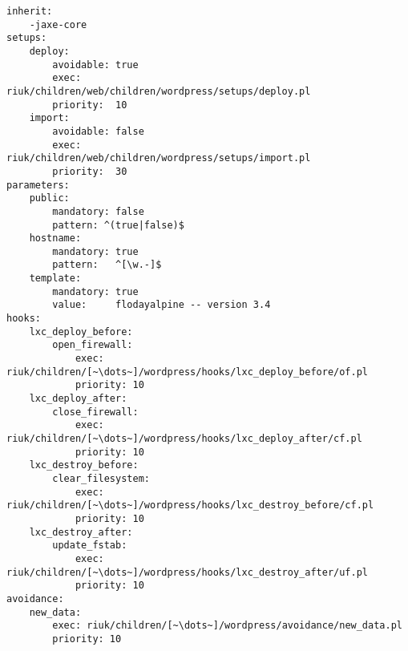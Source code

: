 \begin{lstlisting}[float=t, caption={config.yml}, label=fig_1.3_config]
inherit:
	-jaxe-core
setups:
	deploy:
		avoidable: true
		exec:      riuk/children/web/children/wordpress/setups/deploy.pl
		priority:  10
	import:
		avoidable: false
		exec:      riuk/children/web/children/wordpress/setups/import.pl
		priority:  30
parameters:
	public:
		mandatory: false
		pattern: ^(true|false)$
	hostname:
		mandatory: true
		pattern:   ^[\w.-]$
	template:
		mandatory: true
		value:     flodayalpine -- version 3.4
hooks:
	lxc_deploy_before:
		open_firewall:
			exec:     riuk/children/[~\dots~]/wordpress/hooks/lxc_deploy_before/of.pl
			priority: 10
	lxc_deploy_after:
		close_firewall:
			exec:     riuk/children/[~\dots~]/wordpress/hooks/lxc_deploy_after/cf.pl
			priority: 10
	lxc_destroy_before:
		clear_filesystem:
			exec:     riuk/children/[~\dots~]/wordpress/hooks/lxc_destroy_before/cf.pl
			priority: 10
	lxc_destroy_after:
		update_fstab:
			exec:     riuk/children/[~\dots~]/wordpress/hooks/lxc_destroy_after/uf.pl
			priority: 10
avoidance:
	new_data:
		exec: riuk/children/[~\dots~]/wordpress/avoidance/new_data.pl
		priority: 10
\end{lstlisting}
